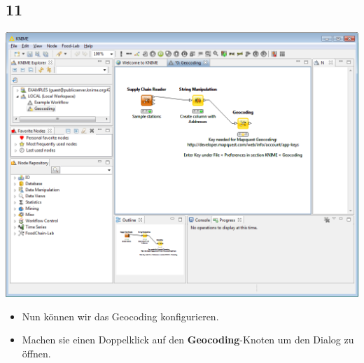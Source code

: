 \documentclass{beamer}
\begin{document}
\subsection{11}
\begin{frame}
	\begin{center}
  		\includegraphics[height=0.6\textheight]{11.png}
	\end{center}
	\begin{itemize}
		\item Nun können wir das Geocoding konfigurieren.
		\item Machen sie einen Doppelklick auf den \textbf{Geocoding}-Knoten um den Dialog zu öffnen.
	\end{itemize}
\end{frame}
\end{document}
